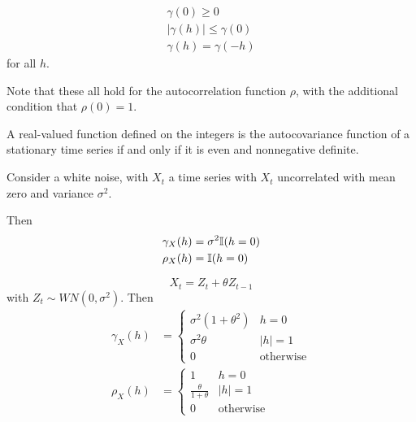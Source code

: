 \begin{lem}
  \begin{align}
    \label{eq:13}
    \gamma(0) \geq 0 \\
    |\gamma(h)| \leq \gamma(0) \\
    \gamma(h) = \gamma(-h)
  \end{align} for all $h$.

  Note that these all hold for the autocorrelation function $\rho$,
  with the additional condition that $\rho(0) = 1$.
\end{lem}

\begin{thm}
  \label{defn:time_series:16}
  A real-valued function defined on the integers is the autocovariance
  function of a stationary time series if and only if it is even and
  nonnegative definite.
\end{thm}

\begin{exmp}
  \label{defn:time_series:10}
  Consider a white noise, with $X_{t}$ a time series with $X_{t}$
  uncorrelated with mean zero and variance $\sigma^{2}$.

  Then
  \begin{align}
    \label{eq:4}
    \gamma_{X}(h) &= \sigma^{2} \I{h=0} \\
    \rho_{X}(h) &= \I{h=0}
  \end{align}
\end{exmp}

\begin{exmp}
  \label{defn:time_series:11}
  \begin{equation}
    \label{eq:5}
    X_{t} = Z_{t} + \theta Z_{t-1}
  \end{equation}
  with $Z_{t} \sim WN(0, \sigma^{2})$.  Then
  \begin{align}
    \label{eq:6}
    \gamma_{X}(h) &=
    \begin{cases}
      \sigma^{2}(1 + \theta^{2}) & h = 0 \\
      \sigma^{2} \theta & |h| = 1 \\
      0 & \text{otherwise}
    \end{cases} \\
    \rho_{X}(h) &=
    \begin{cases}
      1 & h = 0 \\
      \frac{\theta}{1 + \theta} & |h| = 1 \\
      0 & \text{otherwise}
    \end{cases}
  \end{align}
\end{exmp}

